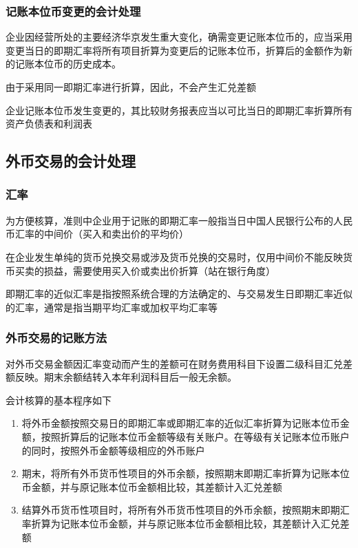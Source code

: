 \documentclass[UTF8,12pt]{ctexart}
\numberwithin{equation}{section} %
\numberwithin{figure}{section}
\numberwithin{table}{section}
\begin{document}
	
	\subsubsection{记账本位币变更的会计处理}
	企业因经营所处的主要经济华京发生重大变化，确需变更记账本位币的，应当采用变更当日的即期汇率将所有项目折算为变更后的记账本位币，折算后的金额作为新的记账本位币的历史成本。
	
	由于采用同一即期汇率进行折算，因此，不会产生汇兑差额
	
	企业记账本位币发生变更的，其比较财务报表应当以可比当日的即期汇率折算所有资产负债表和利润表
	
	
	\subsection{外币交易的会计处理}
	\subsubsection{汇率}
	为方便核算，准则中企业用于记账的即期汇率一般指当日中国人民银行公布的人民币汇率的中间价（买入和卖出价的平均价）
	
	在企业发生单纯的货币兑换交易或涉及货币兑换的交易时，仅用中间价不能反映货币买卖的损益，需要使用买入价或卖出价折算（站在银行角度）
	
	即期汇率的近似汇率是指按照系统合理的方法确定的、与交易发生日即期汇率近似的汇率，通常是指当期平均汇率或加权平均汇率等
	
	\subsubsection{外币交易的记账方法}
	对外币交易金额因汇率变动而产生的差额可在财务费用科目下设置二级科目汇兑差额反映。期末余额结转入本年利润科目后一般无余额。
	
	会计核算的基本程序如下
	\begin{enumerate}
		\item 将外币金额按照交易日的即期汇率或即期汇率的近似汇率折算为记账本位币金额，按照折算后的记账本位币金额等级有关账户。在等级有关记账本位币账户的同时，按照外币金额等级相应的外币账户
		
		\item 期末，将所有外币货币性项目的外币余额，按照期末即期汇率折算为记账本位币金额，并与原记账本位币金额相比较，其差额计入汇兑差额
		
		\item 结算外币货币性项目时，将所有外币货币性项目的外币余额，按照期末即期汇率折算为记账本位币金额，并与原记账本位币金额相比较，其差额计入汇兑差额
	\end{enumerate}
\end{document}
